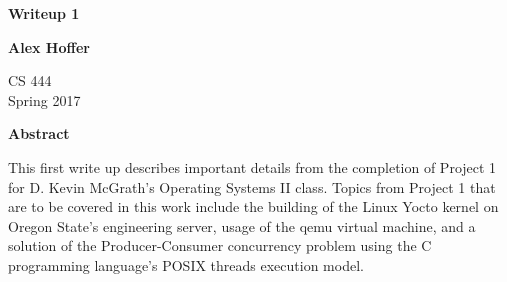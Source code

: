\documentclass[letterpaper,10pt,titlepage]{article}
\begin{document}
\begin{titlepage}
    \begin{center}
        \vspace*{3.5cm}

        \textbf{Writeup 1}

        \vspace{0.5cm}

        \textbf{Alex Hoffer}

        \vspace{0.8cm}

        CS 444\\
        Spring 2017\\

        \vspace{1cm}

        \textbf{Abstract}\\

        \vspace{0.5cm}

        This first write up describes important details from the completion of Project 1 for D. Kevin McGrath's Operating Systems II class. Topics from Project 1 that are to be covered in this work include the building of the Linux Yocto kernel on Oregon State's engineering server, usage of the qemu virtual machine, and a solution of the Producer-Consumer concurrency problem using the C programming language's POSIX threads execution model. 

        \vfill

    \end{center}
\end{titlepage}

\newpage

\tableofcontents

\newpage
\end{document}
